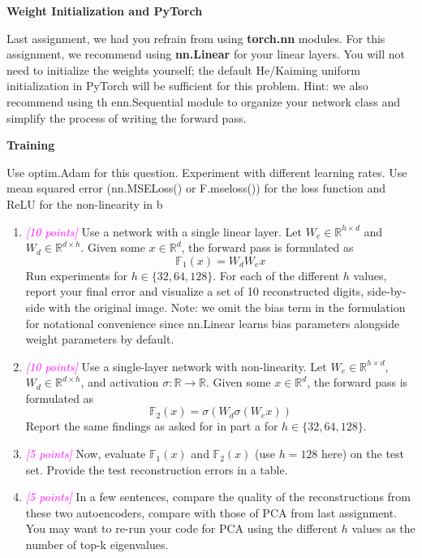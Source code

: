 \documentclass{article}
\newcommand{\field}[1]{\mathbb{#1}}
\newcommand{\1}{\mathbf{1}}
\newcommand{\R}{\field{R}} %
\newcommand{\F}{\field{F}} %
\newcommand{\points}[1]{\small\textcolor{magenta}{\emph{[#1 points]}} \normalsize}
\begin{document}
\textbf{Weight Initialization and PyTorch}

Last assignment, we had you refrain from using \textbf{torch.nn} modules. For this assignment, we recommend using \textbf{nn.Linear} for your linear layers. You will not need to initialize the weights yourself; the default He/Kaiming uniform initialization in PyTorch will be sufficient for this problem. Hint: we also recommend using th enn.Sequential module to organize your network class and simplify the process of writing the forward pass. 

\textbf{Training}

Use optim.Adam for this question. Experiment with different learning rates. Use mean squared error (nn.MSELoss() or F.mseloss()) for the loss function and ReLU for the non-linearity in b

\begin{enumerate}
    \item \points{10} Use a network with a single linear layer. Let $W_e\in\R^{h\times d}$ and $W_d\in\R^{d\times h}$. Given some $x\in\R^d$, the forward pass is formulated as 
    $$\F_1(x) =W_dW_ex$$
    Run experiments for $h\in \{32,64,128\}$. For each of the different $h$ values, report your  final error and visualize a set of 10 reconstructed digits, side-by-side with the original image. Note: we omit the bias term in the formulation for notational convenience since nn.Linear learns bias parameters alongside weight parameters by default.
    
    \item \points{10} Use a single-layer network with non-linearity. Let $W_e\in\R^{h\times d}$,$W_d\in\R^{d\times h}$, and activation $\sigma:\R\rightarrow\R$. Given some $x\in\R^d$, the forward pass is formulated as 
    $$\F_2(x) = \sigma(W_d\sigma(W_ex))$$
    Report the same findings as asked for in part a for $h\in\{32,64,128\}$.
    
    \item \points{5} Now, evaluate $\F_1(x)$ and $\F_2(x)$ (use $h=128$ here) on the test set. Provide the test reconstruction errors in a table.
    
    \item \points{5} In a few sentences, compare the quality of the reconstructions from these two autoencoders, compare with those of PCA from last assignment. You may want to re-run your code for PCA using the different $h$ values as the number of top-k eigenvalues.
\end{enumerate}
\end{document}
